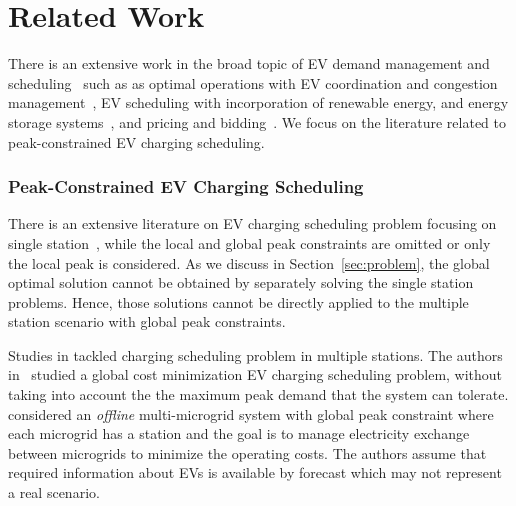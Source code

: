 \section{Related Work}
\label{sec:rel}
There is an extensive work in the broad topic of EV demand management and scheduling~\cite{mukherjee2015review} such as as optimal operations with EV coordination and congestion management~\cite{rigas2013congestion,hu2013coordinated}, EV scheduling with incorporation of renewable energy, and energy storage systems~\cite{de2017impact,shafie2018innovative}, and pricing and bidding~\cite{huang2014distribution}. 
We focus on the literature related to peak-constrained EV charging scheduling.
\subsubsection{Peak-Constrained EV Charging Scheduling}
\label{sec:rel:peakconstrained}			
There is an extensive literature on EV charging scheduling problem focusing on single station~\cite{Tang,Wen}, while the local and global peak constraints are omitted or only the local peak is considered. As we discuss in Section~\ref{sec:problem}, the global optimal solution cannot be obtained by separately solving the single station problems. Hence, those solutions cannot be directly applied to the multiple station scenario with global peak constraints. 

Studies in \cite{He,malhotra2017distributed,Moradijoz,DWang,Zeng,Shaaban} tackled charging scheduling problem in multiple stations. The authors in~\cite{He} studied a global cost minimization EV charging scheduling problem, without taking into account the the maximum peak demand that the system can tolerate.  
\cite{DWang,Zeng,Shaaban} considered an \textit{offline} multi-microgrid system with global peak constraint where each microgrid has a station and the goal is to manage electricity exchange between microgrids to minimize the operating costs. The authors assume that required information about EVs is available by forecast which may not represent a real scenario. 

